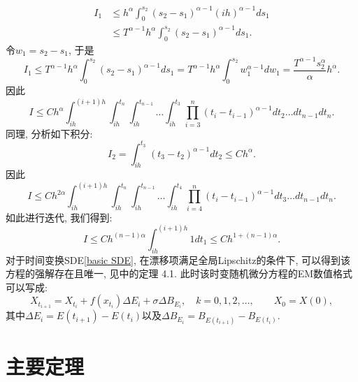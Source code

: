\documentclass[12pt, final]{article}
\makeatletter
\numberwithin{equation}{section}
\numberwithin{figure}{section}
\numberwithin{table}{section}
\theoremstyle{plain}
\renewcommand{\proofname}{证明}
\theoremstyle{Definition}
\theoremstyle{Remark}
\renewenvironment{proof}[1][\proofname]{\par
	\pushQED{\qed}%
	\normalfont \topsep6\p@\@plus6\p@\relax
	\trivlist\item[\hskip\labelsep
	\bfseries #1\@addpunct{\, :\, }]\ignorespaces
}{%
	\popQED\endtrivlist\@endpefalse
}
\makeatother
\begin{document}
\begin{proof}
		\begin{align*}
			I_1 &\le h^{\alpha}\int_{0}^{s_{2}} (s_{2}-s_{1})^{\alpha -1} (ih)^{\alpha - 1} ds_1 \\
			&\le  T^{\alpha - 1}h^{\alpha}\int_{0}^{s_{2}} (s_{2}-s_{1})^{\alpha -1} ds_1. 
		\end{align*}
		令$w_1=s_{2}-s_{1}$, 于是
		\begin{equation*}
			I_1\le T^{\alpha - 1}h^{\alpha}\int_{0}^{s_{2}} (s_{2}-s_{1})^{\alpha -1} ds_1
			=  T^{\alpha - 1}h^{\alpha}\int_{0}^{s_{2}} w_1^{\alpha -1} dw_1
			=  \frac{T^{\alpha - 1}s_{2}^\alpha}{\alpha}h^{\alpha}. 
		\end{equation*}
		因此
		\begin{equation*}
			I \le Ch^\alpha
			\int_{ih}^{(i+1)h}\int_{ih}^{t_n}\int_{ih}^{t_{n-1}} \ldots \int_{ih}^{t_{3}} 
			\prod_{i=3}^{n}(t_i-t_{i-1})^{\alpha -1} dt_{2} \ldots dt_{n-1}dt_n. 
		\end{equation*}
		同理, 分析如下积分:
		\begin{equation*}
			I_{2} = \int_{ih}^{t_{3}}(t_{3}-t_{2})^{\alpha -1}
			dt_{2} \le Ch^\alpha. 
		\end{equation*}
		因此
		\begin{equation*}
			I \le Ch^{2\alpha}
			\int_{ih}^{(i+1)h}\int_{ih}^{t_n}\int_{ih}^{t_{n-1}} \ldots \int_{ih}^{t_{4}} 
			\prod_{i=4}^{n}(t_i-t_{i-1})^{\alpha -1} dt_{3} \ldots dt_{n-1}dt_n. 
		\end{equation*}
		如此进行迭代, 我们得到:
		\begin{equation*}
			I \le Ch^{(n-1)\alpha}\int_{ih}^{(i+1)h} 1 dt_1 \le Ch^{1+(n-1)\alpha}. 
		\end{equation*}
	\end{proof}
	对于时间变换SDE\eqref{basic SDE}, 在漂移项满足全局Lipschitz的条件下, 可以得到该方程的强解存在且唯一, 见\cite{kobayashi2011stochastic}中的定理 4.1. 此时该时变随机微分方程的EM数值格式可以写成:
	\begin{equation}\label{eq:1}
		X_{t_{i+1}}=X_{t_i}+f(x_{t_i})\Delta E_{i}+\sigma\Delta B_{E_{i}}, \quad k=0, 1, 2, \ldots, \qquad X_0=X(0), 
	\end{equation}
	其中$\Delta E_{i}=E(t_{i+1})-E(t_i)$以及$\Delta B_{E_{i}}=B_{E{(t_{i+1})}}-B_{E({t_i})}$. 
	
	\section{主要定理}
	
\end{document}

